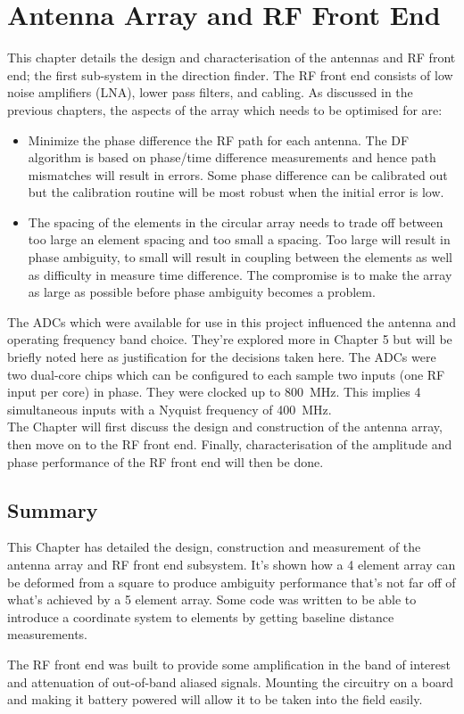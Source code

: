 \chapter{Antenna Array and RF Front End}
\label{ch:rf-front-end}
\graphicspath{{./img/rf-front-end/}}

This chapter details the design and characterisation of the antennas and RF front end; the first sub-system in the direction finder. The RF front end consists of low noise amplifiers (LNA), lower pass filters, and cabling. As discussed in the previous chapters, the aspects of the array which needs to be optimised for are:
\begin{itemize}
  \item Minimize the phase difference the RF path for each antenna. The DF algorithm is based on phase/time difference measurements and hence path mismatches will result in errors. Some phase difference can be calibrated out but the calibration routine will be most robust when the initial error is low.
  \item The spacing of the elements in the circular array needs to trade off between too large an element spacing and too small a spacing. Too large will result in phase ambiguity, to small will result in coupling between the elements as well as difficulty in measure time difference. The compromise is to make the array as large as possible before phase ambiguity becomes a problem.
\end{itemize}

The ADCs which were available for use in this project influenced the antenna and operating frequency band choice. They're explored more in Chapter 5 but will be briefly noted here as justification for the decisions taken here. The ADCs were two dual-core chips which can be configured to each sample two inputs (one RF input per core) in phase. They were clocked up to \SI{800}{\mega\hertz}. This implies 4 simultaneous inputs with a Nyquist frequency of \SI{400}{\mega\hertz}.\\

The Chapter will first discuss the design and construction of the antenna array, then move on to the RF front end. Finally, characterisation of the amplitude and phase performance of the RF front end will then be done. 





\section{Summary}
This Chapter has detailed the design, construction and measurement of the antenna array and RF front end subsystem. It's shown how a 4 element array can be deformed from a square to produce ambiguity performance that's not far off of what's achieved by a 5 element array. Some code was written to be able to introduce a coordinate system to elements by getting baseline distance measurements. 

The RF front end was built to provide some amplification in the band of interest and attenuation of out-of-band aliased signals. Mounting the circuitry on a board and making it battery powered will allow it to be taken into the field easily.
